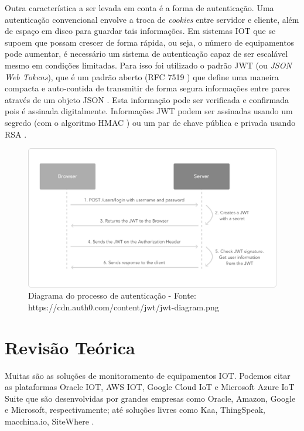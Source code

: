 Outra característica a ser levada em conta é a forma de autenticação.
Uma autenticação convencional envolve a troca de \emph{cookies} entre
servidor e cliente, além de espaço em disco para guardar tais
informações. Em sistemas IOT que se supoem que possam crescer de forma
rápida, ou seja, o número de equipamentos pode aumentar, é necessário um
sistema de autenticação capaz de ser escalável mesmo em condições
limitadas. Para isso foi utilizado o padrão JWT (ou \emph{JSON Web
Tokens}), que é um padrão aberto (RFC 7519 \cite{rfc7519-2015}) que
define uma maneira compacta e auto-contida de transmitir de forma segura
informações entre pares através de um objeto JSON \cite{jwt-2016}. Esta
informação pode ser verificada e confirmada pois é assinada
digitalmente. Informações JWT podem ser assinadas usando um segredo (com
o algoritmo HMAC \cite{rfc2104-1997}) ou um par de chave pública e
privada usando RSA \cite{rfc3447-2003}.

\begin{figure}[h]
    \centering
    \includegraphics[scale=0.3]{img/jwt-diagram-grey.png}
    \caption{Diagrama do processo de autenticação - Fonte: https://cdn.auth0.com/content/jwt/jwt-diagram.png}
\end{figure}

\section{Revisão Teórica}\label{revisuxe3o-teuxf3rica}

Muitas são as soluções de monitoramento de equipamentos IOT. Podemos
citar as plataformas Oracle IOT, AWS IOT, Google Cloud IoT e Microsoft
Azure IoT Suite que são desenvolvidas por grandes empresas como Oracle,
Amazon, Google e Microsoft, respectivamente; até soluções livres como
Kaa, ThingSpeak, macchina.io, SiteWhere \cite{postscapes-iot-2016}.

